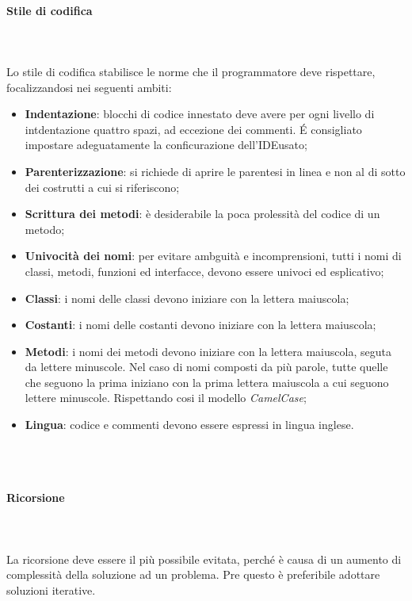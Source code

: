 		\paragraph{Stile di codifica} \mbox{} \\ \mbox{} \\
		Lo stile di codifica stabilisce le norme che il programmatore deve rispettare, focalizzandosi nei seguenti ambiti:
		\begin{itemize}
			\item[] \textbf{Indentazione}: blocchi di codice innestato deve avere per ogni livello di intdentazione quattro spazi, ad eccezione dei commenti. \'E consigliato impostare adeguatamente la conficurazione dell'IDE\glo usato;
			\item[] \textbf{Parenterizzazione}: si richiede di aprire le parentesi in linea e non al di sotto dei costrutti a cui si riferiscono;
			\item[] \textbf{Scrittura dei metodi}: è desiderabile la poca prolessità del codice di un metodo;
			\item[] \textbf{Univocità dei nomi}: per evitare ambguità e incomprensioni, tutti i nomi di classi, metodi, funzioni ed interfacce, devono essere univoci ed esplicativo;
			\item[] \textbf{Classi}: i nomi delle classi devono iniziare con la lettera maiuscola;
			\item[] \textbf{Costanti}: i nomi delle costanti devono iniziare con la lettera maiuscola;
			\item[] \textbf{Metodi}: i nomi dei metodi devono iniziare con la lettera maiuscola, seguta da lettere minuscole. Nel caso di nomi composti da più parole, tutte quelle che seguono la prima iniziano con la prima lettera maiuscola a cui seguono lettere minuscole. Rispettando cosi il modello \textit{CamelCase}\glo;
			\item[] \textbf{Lingua}: codice e commenti devono essere espressi in lingua inglese.
		\end{itemize}
		\\
		\\
		\paragraph{Ricorsione} \mbox{} \\ \mbox{} \\
		La ricorsione deve essere il più possibile evitata, perché è causa di un aumento di complessità della soluzione ad un problema. Pre questo è preferibile adottare soluzioni iterative.


